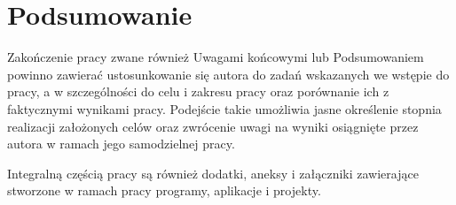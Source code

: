 \chapter{Podsumowanie}

Zakończenie pracy zwane również Uwagami końcowymi lub Podsumowaniem powinno zawierać ustosunkowanie
się autora do zadań wskazanych we wstępie do pracy, a w szczególności do celu i zakresu pracy oraz
porównanie ich z faktycznymi wynikami pracy. Podejście takie umożliwia jasne określenie stopnia
realizacji założonych celów oraz zwrócenie uwagi na wyniki osiągnięte przez autora w ramach jego
samodzielnej pracy.

Integralną częścią pracy są również dodatki, aneksy i załączniki zawierające stworzone w ramach pracy programy, aplikacje i projekty.